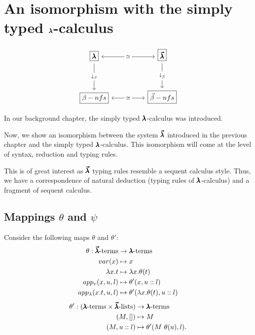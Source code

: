 \chapter{An isomorphism with the simply typed $\pmb{\lambda}$-calculus}
\label{c:isomorphism}
\[
  \begin{tikzcd}
    {\boxed \Lam} && {\boxed \LamV} \\
    \\
    {\boxed{\small{\beta-nfs}}} && {\boxed{\small{\vec \beta-nfs}}}
    \arrow["\cong"{description}, <->, from=1-1, to=1-3]
    \arrow["{\downarrow_\beta}"{description}, from=1-1, to=3-1]
    \arrow["{\downarrow_{\vec \beta}}"{description}, from=1-3, to=3-3]
    \arrow["\cong"{description}, <->, from=3-1, to=3-3]
  \end{tikzcd}
\]

In our background chapter, the simply typed $\pmb{\lambda}$-calculus was introduced.

Now, we show an isomorphism between the system $\pmb{\vec \lambda}$ introduced in the previous chapter and the simply typed $\pmb{\lambda}$-calculus.
This isomorphism will come at the level of syntax, reduction and typing rules.

This is of great interest as $\pmb{\vec \lambda}$ typing rules resemble a sequent calculus style. Thus, we have a correspondence of natural deduction (typing rules of $\pmb{\lambda}$-calculus) and a fragment of sequent calculus.

\section{Mappings $\theta$ and $\psi$}

\begin{definition}
  Consider the following maps $\theta$ and $\theta'$:
  \begin{align*}
    \theta : \pmb{\vec \lambda} \text{-terms} &\to \pmb{\lambda} \text{-terms} \\
    var(x) &\mapsto x \\
    \lambda x . t &\mapsto \lambda x . \theta(t) \\
    app_v (x, u, l) &\mapsto \theta'(x, u::l) \\
    app_\lambda (x. t, u, l) &\mapsto \theta'(\lambda x . \theta(t), u::l)
  \end{align*}
  \begin{align*}
    \theta' : (\pmb{\lambda} \text{-terms} \times \pmb{\vec \lambda} \text{-lists}) & \to \pmb{\lambda} \text{-terms} \\
    (M, []) &\mapsto M \\
    (M, u::l) &\mapsto \theta'(M \ \theta(u), l).
  \end{align*}
\end{definition}
  
